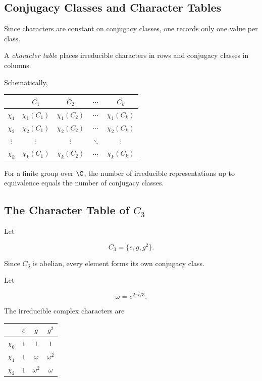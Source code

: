 \subsection{Conjugacy Classes and Character Tables}
\label{subsec:character-tables}

Since characters are constant on conjugacy classes, one records only one
value per class.

A \emph{character table} places irreducible characters in rows and conjugacy
classes in columns.

Schematically,

\begin{center}
\begin{tabular}{c|cccc}
 & \(C_1\) & \(C_2\) & \(\cdots\) & \(C_k\)\\
\hline
\(\chi_1\) & \(\chi_1(C_1)\) & \(\chi_1(C_2)\) & \(\cdots\) & \(\chi_1(C_k)\)\\
\(\chi_2\) & \(\chi_2(C_1)\) & \(\chi_2(C_2)\) & \(\cdots\) & \(\chi_2(C_k)\)\\
\(\vdots\) & \(\vdots\) & \(\vdots\) & \(\ddots\) & \(\vdots\)\\
\(\chi_k\) & \(\chi_k(C_1)\) & \(\chi_k(C_2)\) & \(\cdots\) & \(\chi_k(C_k)\)
\end{tabular}
\end{center}

For a finite group over \(\C\), the number of irreducible representations up
to equivalence equals the number of conjugacy classes.

\subsection{The Character Table of \(C_3\)}
\label{subsec:character-table-c3}

Let

\[ C_3=\{e,g,g^2\}. \]

Since \(C_3\) is abelian, every element forms its own conjugacy class.

Let

\[ \omega=e^{2\pi i/3}. \]

The irreducible complex characters are

\begin{center}
\begin{tabular}{c|ccc}
\toprule
 & \(e\) & \(g\) & \(g^2\)\\
\midrule
\(\chi_0\) & \(1\) & \(1\) & \(1\)\\
\(\chi_1\) & \(1\) & \(\omega\) & \(\omega^2\)\\
\(\chi_2\) & \(1\) & \(\omega^2\) & \(\omega\)\\
\bottomrule
\end{tabular}
\end{center}

